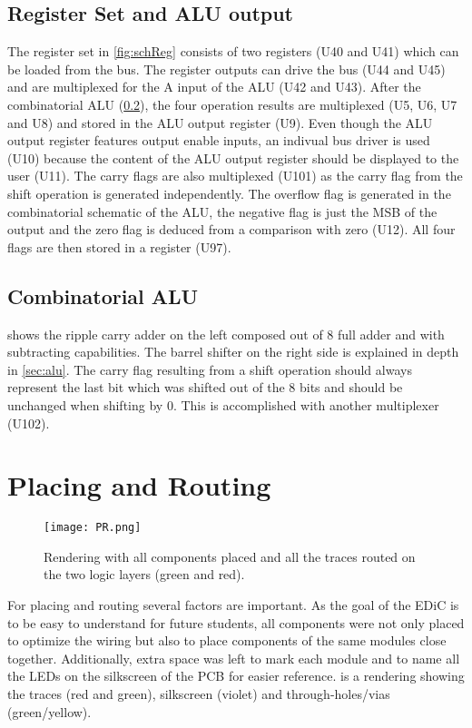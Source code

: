 \subsection{Register Set and \gls{ALU} output}
The register set in \cref{fig:schReg} consists of two registers (U40 and U41) which can be loaded from the bus.
The register outputs can drive the bus (U44 and U45) and are multiplexed for the A input of the \gls{ALU} (U42 and U43).
After the combinatorial \gls{ALU} (\cref{sec:schALU}), the four operation results are multiplexed (U5, U6, U7 and U8) and stored in the \gls{ALU} output register (U9).
Even though the \gls{ALU} output register features output enable inputs, an indivual bus driver is used (U10) because the content of the \gls{ALU} output register should be displayed to the user (U11).
The carry flags are also multiplexed (U101) as the carry flag from the shift operation is generated independently.
The overflow flag is generated in the combinatorial schematic of the \gls{ALU}, the negative flag is just the \gls{MSB} of the output and the zero flag is deduced from a comparison with zero (U12).
All four flags are then stored in a register (U97).
\subsection{Combinatorial \gls{ALU}}\label{sec:schALU}
 shows the ripple carry adder on the left composed out of 8 full adder and with subtracting capabilities.
The barrel shifter on the right side is explained in depth in \cref{sec:alu}.
The carry flag resulting from a shift operation should always represent the last bit which was shifted out of the 8 bits and should be unchanged when shifting by 0.
This is accomplished with another multiplexer (U102).

\section{Placing and Routing}\label{sec:pr}
\begin{figure}[p]
  \centering
  \texttt{[image: PR.png]}
  \caption{Rendering with all components placed and all the traces routed on the two logic layers (green and red).}
  \label{fig:pr}
\end{figure}
For placing and routing several factors are important.
As the goal of the \gls{EDiC} is to be easy to understand for future students, all components were not only placed to optimize the wiring but also to place components of the same modules close together.
Additionally, extra space was left to mark each module and to name all the \glspl{LED} on the silkscreen of the \gls{PCB} for easier reference.
 is a rendering showing the traces (red and green), silkscreen (violet) and through-holes/vias (green/yellow).


